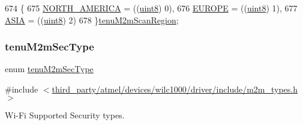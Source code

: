 \begin{DoxyCode}
674              \{
675     \hyperlink{group__WlanEnums_gga7ffc49398ba597866801fd1e847a4183a6a118305aab2bd0ff82e4d51f1898753}{NORTH\_AMERICA} = ((\hyperlink{group__DataT_ga4df709a77647e870bbf1d955b8edc9a6}{uint8}) 0),
676     \hyperlink{group__WlanEnums_gga7ffc49398ba597866801fd1e847a4183a66b9054cf247c2d2a24ac27d7ae6eb72}{EUROPE}        =   ((\hyperlink{group__DataT_ga4df709a77647e870bbf1d955b8edc9a6}{uint8}) 1),
677     \hyperlink{group__WlanEnums_gga7ffc49398ba597866801fd1e847a4183a32a37613e77fb416d0995b8612262bea}{ASIA}        =   ((\hyperlink{group__DataT_ga4df709a77647e870bbf1d955b8edc9a6}{uint8}) 2)
678 \}\hyperlink{group__WlanEnums_ga7ffc49398ba597866801fd1e847a4183}{tenuM2mScanRegion};
\end{DoxyCode}
\mbox{\label{group__WlanEnums_gaa232a09c953ec8200c13774f94107b05}} 
\subsubsection{\texorpdfstring{tenu\+M2m\+Sec\+Type}{tenuM2mSecType}}
{\footnotesize\ttfamily enum \hyperlink{group__WlanEnums_gaa232a09c953ec8200c13774f94107b05}{tenu\+M2m\+Sec\+Type}}



{\ttfamily \#include $<$\hyperlink{m2m__types_8h}{third\+\_\+party/atmel/devices/wilc1000/driver/include/m2m\+\_\+types.\+h}$>$}



Wi-\/\+Fi Supported Security types. 

